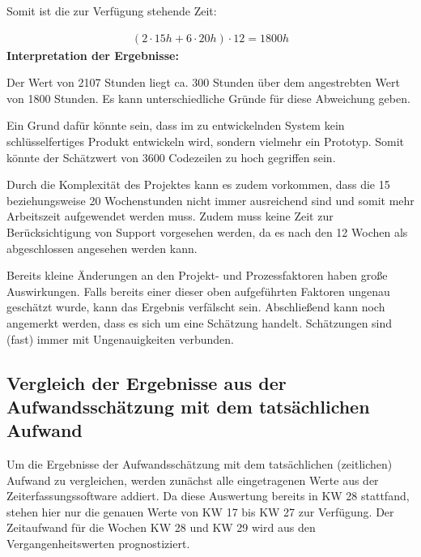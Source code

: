 \documentclass[../review_3.tex]{subfiles}
\begin{document}
Somit ist die zur Verfügung stehende Zeit:

\begin{align*}
    (2\cdot15 h+6\cdot20 h)\cdot12=1800h
\end{align*}
\textbf{Interpretation der Ergebnisse:}

Der Wert von 2107 Stunden liegt ca. 300 Stunden über dem angestrebten Wert von 1800 Stunden. Es kann unterschiedliche Gründe für diese Abweichung geben.

Ein Grund dafür könnte sein, dass im zu entwickelnden System kein schlüsselfertiges Produkt entwickeln wird, sondern vielmehr ein Prototyp. Somit könnte der Schätzwert von 3600 Codezeilen zu hoch gegriffen sein.

Durch die Komplexität des Projektes kann es zudem vorkommen, dass die 15 beziehungsweise 20 Wochenstunden nicht immer ausreichend sind und somit mehr Arbeitszeit aufgewendet werden muss.
Zudem muss keine Zeit zur Berücksichtigung von Support vorgesehen werden, da es nach den 12 Wochen als abgeschlossen angesehen werden kann.

Bereits kleine Änderungen an den Projekt- und Prozessfaktoren haben große Auswirkungen. Falls bereits einer dieser oben aufgeführten Faktoren ungenau geschätzt wurde, kann das Ergebnis verfälscht sein.
Abschließend kann noch angemerkt werden, dass es sich um eine Schätzung handelt. Schätzungen sind (fast) immer mit Ungenauigkeiten verbunden.

\subsection{Vergleich der Ergebnisse aus der Aufwandsschätzung mit dem tatsächlichen Aufwand} \label{kap2}

Um die Ergebnisse der Aufwandsschätzung mit dem tatsächlichen (zeitlichen) Aufwand zu vergleichen, werden zunächst alle eingetragenen Werte aus der Zeiterfassungssoftware addiert. Da diese Auswertung bereits in KW 28 stattfand, stehen hier nur die genauen Werte von KW 17 bis KW 27 zur Verfügung. Der Zeitaufwand für die Wochen KW 28 und KW 29 wird aus den Vergangenheitswerten prognostiziert.
\end{document}
